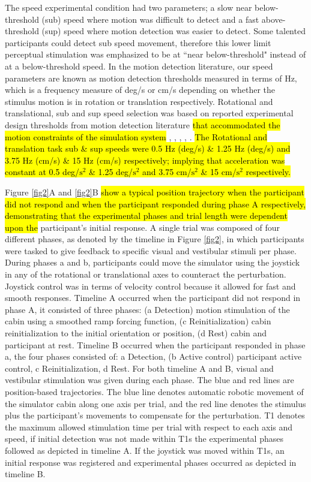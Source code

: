 \documentclass{ieeeaccess}
\begin{document}
\noindent The speed experimental condition had two parameters; a slow near below-threshold (sub) speed where motion was difficult to detect and a fast above-threshold (sup) speed where motion detection was easier to detect. Some talented participants could detect sub speed movement, therefore this lower limit perceptual stimulation was emphasized to be at ``near below-threshold" instead of at a below-threshold speed. In the motion detection literature, our speed parameters are known as motion detection thresholds measured in terms of Hz, which is a frequency measure of deg/s or cm/s depending on whether the stimulus motion is in rotation or translation respectively. Rotational and translational, sub and sup speed selection was based on reported experimental design thresholds from motion detection literature \hl{that accommodated the motion constraints of the simulation system} \cite{Hartmann_2014_Direction}, \cite{BermudezRey_2016_Vestibular}, \cite{Karmali_2017_Multivariate}, \cite{Valko_2012_Vestibular}, \cite{Melvill_1978_Vertical}. \hl{The Rotational and translation task sub \& sup speeds were 0.5 Hz (deg/s) \& 1.25 Hz (deg/s) and 3.75 Hz (cm/s) \& 15 Hz (cm/s) respectively; implying that acceleration was constant at 0.5 deg/$\textrm{s}^{2}$ \& 1.25 deg/$\textrm{s}^{2}$ and 3.75 cm/$\textrm{s}^{2}$ \& 15 cm/$\textrm{s}^{2}$ respectively.}

\indent Figure \ref{fig2}A and \ref{fig2}B \hl{show a typical position trajectory when the participant did not respond and when the participant responded during phase A respectively, demonstrating that the experimental phases and trial length were dependent upon the} participant’s initial response. A single trial was composed of four different phases, as denoted by the timeline in Figure \ref{fig2}, in which participants were tasked to give feedback to specific visual and vestibular stimuli per phase. During phases a and b, participants could move the simulator using the joystick in any of the rotational or translational axes to counteract the perturbation. Joystick control was in terms of velocity control because it allowed for fast and smooth responses. Timeline A occurred when the participant did not respond in phase A, it consisted of three phases: (a Detection) motion stimulation of the cabin using a smoothed ramp forcing function, (c Reinitialization) cabin reinitialization to the initial orientation or position, (d Rest) cabin and participant at rest. Timeline B occurred when the participant responded in phase a, the four phases consisted of: a Detection, (b Active control) participant active control, c Reinitialization, d Rest. For both timeline A and B, visual and vestibular stimulation was given during each phase. The blue and red lines are position-based trajectories. The blue line denotes automatic robotic movement of the simulator cabin along one axis per trial, and the red line denotes the stimulus plus the participant’s movements to compensate for the perturbation. T1 denotes the maximum allowed stimulation time per trial with respect to each axis and speed, if initial detection was not made within T1s the experimental phases followed as depicted in timeline A. If the joystick was moved within T1s, an initial response was registered and experimental phases occurred as depicted in timeline B.
\end{document}
